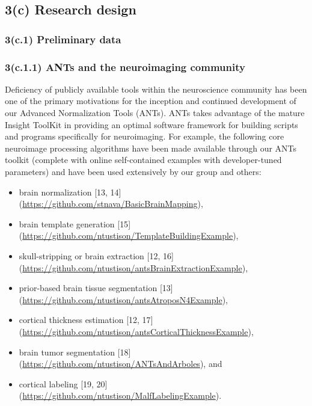 \documentclass[11pt,]{article}
\begin{document}
\subsection{\textbf{3(c) Research design}}\label{c-research-design}

\subsubsection{3(c.1) Preliminary data}\label{c.1-preliminary-data}

\subsubsection{3(c.1.1) ANTs and the neuroimaging
community}\label{c.1.1-ants-and-the-neuroimaging-community}

Deficiency of publicly available tools within the neuroscience community
has been one of the primary motivations for the inception and continued
development of our Advanced Normalization Tools (ANTs). ANTs takes
advantage of the mature Insight ToolKit in providing an optimal software
framework for building scripts and programs specifically for
neuroimaging. For example, the following core neuroimage processing
algorithms have been made available through our ANTs toolkit (complete
with online self-contained examples with developer-tuned parameters) and
have been used extensively by our group and others:

\begin{itemize}
\itemsep1pt\parskip0pt
\item
  brain normalization {[}13, 14{]}
  (\url{https://github.com/stnava/BasicBrainMapping}),
\item
  brain template generation {[}15{]}
  (\url{https://github.com/ntustison/TemplateBuildingExample}),
\item
  skull-stripping or brain extraction {[}12, 16{]}
  (\url{https://github.com/ntustison/antsBrainExtractionExample}),
\item
  prior-based brain tissue segmentation {[}13{]}
  (\url{https://github.com/ntustison/antsAtroposN4Example}),
\item
  cortical thickness estimation {[}12, 17{]}
  (\url{https://github.com/ntustison/antsCorticalThicknessExample}),
\item
  brain tumor segmentation {[}18{]}
  (\url{https://github.com/ntustison/ANTsAndArboles}), and
\item
  cortical labeling {[}19, 20{]}
  (\url{https://github.com/ntustison/MalfLabelingExample}).
\end{itemize}
\end{document}
